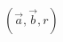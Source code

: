 \documentclass[border=0.5pt]{standalone}
\newcommand{\ba}{\vec{a}}
\newcommand{\bb}{\vec{b}}
\begin{document}
\((\ba,\bb,r)\)
\end{document}
